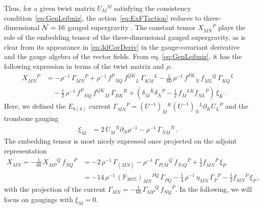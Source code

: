 \documentclass[a4paper, 11pt]{article}
\numberwithin{equation}{section}
\newcommand{\ov}[1]{\overline{#1}}
\newcommand{\EE}{\ensuremath{E_{8(8)}}\xspace}
\newcommand{\+}{\oplus}
\newcommand{\UI}{\left(U^{-1}\right)}
\newcommand{\fl}[1]{\ov{#1}}
\begin{document}
Thus, for a given twist matrix $U_{M}{}^{\fl{M}}$ satisfying the consistency condition~\eqref{eq:GenLeibniz}, the action~\eqref{eq:ExFTaction} reduces to three-dimensional ${\cal N}=16$ gauged supergravity \cite{Nicolai:2000sc,Nicolai:2001sv}. The constant tensor $X_{\fl{M}\fl{N}}{}^{\fl{P}}$ plays the role of the embedding tensor of the three-dimensional gauged supergravity, as is clear from its appearance in \eqref{eq:3dCovDeriv} in the gauge-covariant derivative and the gauge algebra of the vector fields. From eq. \eqref{eq:GenLeibniz}, it has the following expression in terms of the twist matrix and $\rho$:
\begin{equation}
	\begin{split}
		X_{\fl{MN}}{}^{\fl{P}}&=-\rho^{-1}\,\Gamma_{\fl{MN}}{}^{\fl{P}} + \rho^{-1}\,f^{\fl{P}}{}_{\fl{NQ}}\,f^{\fl{QK}}{}_{\fl{L}}\,\Gamma_{\fl{KM}}{}^{\fl{L}}-\frac{1}{60}\,\rho^{-1}\,f^{\fl{PK}}{}_{\fl{N}}\,f_{\fl{ML}}{}^{\fl{Q}}\,\Gamma_{\fl{KQ}}{}^{\fl{L}}\\
		&\quad-\frac{1}{2}\,\rho^{-1}\,f^{\fl{P}}{}_{\fl{NQ}}\,f^{\fl{QK}}{}_{\fl{M}}\,\Gamma_{\fl{RK}}{}^{\fl{R}}+\left(\delta_{\fl{M}}{}^{\fl{K}}\delta_{\fl{N}}{}^{\fl{P}}-\frac{1}{2}\,f_{\fl{M}}{}^{\fl{LK}}f_{\fl{NL}}{}^{\fl{P}}\right)\,\xi_{\fl{K}}\,.
	\end{split}
\end{equation}
Here, we defined the $\EE$ current $\Gamma_{\fl{MN}}{}^{\fl{P}}=\UI_{\fl{M}}{}^{K}\UI_{\fl{N}}{}^{L}\partial_{K}U_{L}{}^{\fl{P}}$ and the trombone gauging
\begin{equation} \label{eq:Trombone}
	\begin{split}
		\xi_{\fl{M}} 
		&= 2\,U_{\fl{M}}{}^{N}\partial_{N}\rho^{-1} - \rho^{-1}\, \Gamma_{\ov{N}\ov{M}}{}^{\ov{N}} \,.
	\end{split}
\end{equation}
The embedding tensor is most nicely expressed once projected on the adjoint representation
\begin{equation} \label{eq:symembeddingtensor}
	\begin{split}
		X_{\fl{MN}} = -\frac{1}{60}\,X_{\fl{MP}}{}^{\fl{Q}}\,f_{\fl{NQ}}{}^{\fl{P}} &= - 2\,\rho^{-1}\,\Gamma_{(\fl{MN})} - \rho^{-1}\,\Gamma_{\fl{P}(\fl{M}}{}^{\fl{Q}}\,f_{\fl{N})\fl{Q}}{}^{\fl{P}} + \frac12 f_{\ov{M}\ov{N}}{}^{\ov{P}}\, \xi_{\ov{P}} \\
		&= - 14\,\rho^{-1}\,(\mathbb{P}_{3875})_{\fl{MN}}{}^{\fl{PQ}}\,\Gamma_{\fl{PQ}} - \frac{1}{4}\,\rho^{-1}\,\eta_{\fl{MN}}\,\Gamma_{\fl{P}}{}^{\fl{P}} - \frac12 f_{\ov{M}\ov{N}}{}^{\ov{P}}\, \xi_{\ov{P}} \,,
	\end{split}
\end{equation}
with the projection of the current $\Gamma_{\fl{MN}} = - \tfrac{1}{60}\,\Gamma_{\fl{MP}}{}^{\fl{Q}}\,f_{\fl{NQ}}{}^{\fl{P}}$. In the following, we will focus on gaugings with $\xi_{\fl{M}}=0$.
\end{document}

